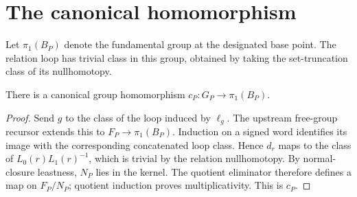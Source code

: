 \section{The canonical homomorphism}

Let $\pi_1(B_P)$ denote the fundamental group at the designated base point. The relation loop has trivial class in this group, obtained by taking the set-truncation class of its nullhomotopy.

\begin{proposition}
There is a canonical group homomorphism $c_P:G_P\to\pi_1(B_P)$.
\end{proposition}
\begin{proof}
Send $g$ to the class of the loop induced by $\ell_g$. The upstream free-group recursor extends this to $F_P\to\pi_1(B_P)$. Induction on a signed word identifies its image with the corresponding concatenated loop class. Hence $d_r$ maps to the class of $L_0(r)L_1(r)^{-1}$, which is trivial by the relation nullhomotopy. By normal-closure leastness, $N_P$ lies in the kernel. The quotient eliminator therefore defines a map on $F_P/N_P$; quotient induction proves multiplicativity. This is $c_P$.
\end{proof}
